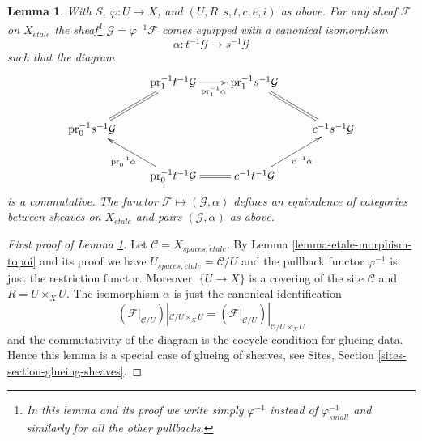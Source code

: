 \documentclass{stacks-project}
\theoremstyle{plain}
\newtheorem{lemma}[subsection]{Lemma}
\theoremstyle{definition}
\theoremstyle{remark}
\numberwithin{equation}{subsection}
\def\etale{{\acute{e}tale}}
\begin{document}
\begin{lemma}
\label{lemma-descent-sheaf}
With $S$, $\varphi : U \to X$, and $(U, R, s, t, c, e, i)$ as above.
For any sheaf $\mathcal{F}$ on $X_\etale$ the
sheaf\footnote{In this lemma
and its proof we write simply $\varphi^{-1}$ instead of $\varphi_{small}^{-1}$
and similarly for all the other pullbacks.}
$\mathcal{G} = \varphi^{-1}\mathcal{F}$ comes equipped with a canonical
isomorphism
$$
\alpha :
t^{-1}\mathcal{G}
\longrightarrow
s^{-1}\mathcal{G}
$$
such that the diagram
$$
\xymatrix{
& \text{pr}_1^{-1}t^{-1}\mathcal{G} \ar[r]_-{\text{pr}_1^{-1}\alpha} &
\text{pr}_1^{-1}s^{-1}\mathcal{G} \ar@{=}[rd] & \\
\text{pr}_0^{-1}s^{-1}\mathcal{G} \ar@{=}[ru] & & &
c^{-1}s^{-1}\mathcal{G} \\
&
\text{pr}_0^{-1}t^{-1}\mathcal{G} \ar[lu]^{\text{pr}_0^{-1}\alpha} \ar@{=}[r] &
c^{-1}t^{-1}\mathcal{G} \ar[ru]_{c^{-1}\alpha}
}
$$
is a commutative. The functor $\mathcal{F} \mapsto (\mathcal{G}, \alpha)$
defines an equivalence of categories between sheaves on
$X_\etale$ and pairs $(\mathcal{G}, \alpha)$ as above.
\end{lemma}

\begin{proof}[First proof of Lemma \ref{lemma-descent-sheaf}]
Let $\mathcal{C} = X_{spaces, \etale}$. By
Lemma \ref{lemma-etale-morphism-topoi}
and its proof we have $U_{spaces, \etale} = \mathcal{C}/U$
and the pullback functor $\varphi^{-1}$ is just the restriction functor.
Moreover, $\{U \to X\}$ is a covering of the site $\mathcal{C}$ and
$R = U \times_X U$. The isomorphism $\alpha$ is just the canonical
identification
$$
\left(\mathcal{F}|_{\mathcal{C}/U}\right)|_{\mathcal{C}/U \times_X U}
=
\left(\mathcal{F}|_{\mathcal{C}/U}\right)|_{\mathcal{C}/U \times_X U}
$$
and the commutativity of the diagram is the cocycle condition for glueing
data. Hence this lemma is a special case of glueing of sheaves, see
Sites, Section \ref{sites-section-glueing-sheaves}.
\end{proof}
\end{document}

